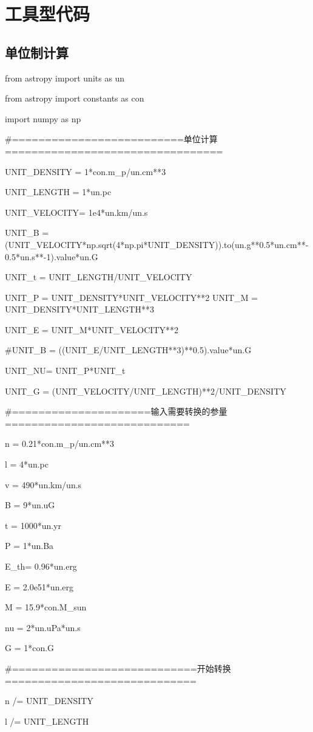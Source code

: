 \chapter{工具型代码}
\label{Code}
\section{单位制计算}
\label{Codeu}
from astropy import units as un

from astropy import constants as con

import numpy as np

\#==========================单位计算=================================

UNIT\_DENSITY = 1*con.m\_p/un.cm**3

UNIT\_LENGTH  = 1*un.pc

UNIT\_VELOCITY= 1e4*un.km/un.s

UNIT\_B = (UNIT\_VELOCITY*np.sqrt(4*np.pi*UNIT\_DENSITY)).to(un.g**0.5*un.cm**-0.5*un.s**-1).value*un.G

UNIT\_t = UNIT\_LENGTH/UNIT\_VELOCITY

UNIT\_P = UNIT\_DENSITY*UNIT\_VELOCITY**2
UNIT\_M = UNIT\_DENSITY*UNIT\_LENGTH**3

UNIT\_E = UNIT\_M*UNIT\_VELOCITY**2

\#UNIT\_B = ((UNIT\_E/UNIT\_LENGTH**3)**0.5).value*un.G

UNIT\_NU= UNIT\_P*UNIT\_t

UNIT\_G = (UNIT\_VELOCITY/UNIT\_LENGTH)**2/UNIT\_DENSITY

\#=====================输入需要转换的参量============================

n   = 0.21*con.m\_p/un.cm**3

l   = 4*un.pc

v   = 490*un.km/un.s

B   = 9*un.uG

t   = 1000*un.yr

P   = 1*un.Ba

E\_th= 0.96*un.erg

E   = 2.0e51*un.erg

M   = 15.9*con.M\_sun

nu  = 2*un.uPa*un.s

G   = 1*con.G

\#============================开始转换=============================

n   /= UNIT\_DENSITY

l   /= UNIT\_LENGTH

